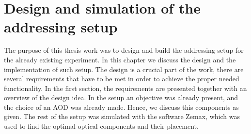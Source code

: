 \chapter{Design and simulation of the addressing setup}
The purpose of this thesis work was to design and build the addressing setup for the already existing experiment. In this chapter we discuss the design and the implementation of such setup. The design is a crucial part of the work, there are several requirements that have to be met in order to achieve the proper needed functionality. In the first section, the requirements are presented together with an overview of the design idea. In the setup an objective was already present, and the choice of an AOD was already made. Hence, we discuss this components as given. The rest of the setup was simulated with the software Zemax, which was used to find the optimal optical components and their placement.
